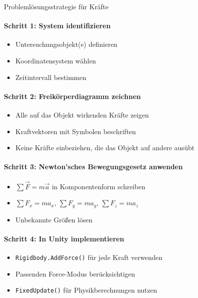 \begin{KR}{Problemlösungsstrategie für Kräfte}
    \paragraph{Schritt 1: System identifizieren}
    \begin{itemize}
        \item Untersuchungsobjekt(e) definieren
        \item Koordinatensystem wählen
        \item Zeitintervall bestimmen
    \end{itemize}
    
    \paragraph{Schritt 2: Freikörperdiagramm zeichnen}
    \begin{itemize}
        \item Alle auf das Objekt wirkenden Kräfte zeigen
        \item Kraftvektoren mit Symbolen beschriften
        \item Keine Kräfte einbeziehen, die das Objekt auf andere ausübt
    \end{itemize}
    
    \paragraph{Schritt 3: Newton'sches Bewegungsgesetz anwenden}
    \begin{itemize}
        \item $\sum \vec{F} = m\vec{a}$ in Komponentenform schreiben
        \item $\sum F_x = ma_x$, $\sum F_y = ma_y$, $\sum F_z = ma_z$
        \item Unbekannte Größen lösen
    \end{itemize}
    
    \paragraph{Schritt 4: In Unity implementieren}
    \begin{itemize}
        \item \texttt{Rigidbody.AddForce()} für jede Kraft verwenden
        \item Passenden Force-Modus berücksichtigen
        \item \texttt{FixedUpdate()} für Physikberechnungen nutzen
    \end{itemize}
\end{KR}

